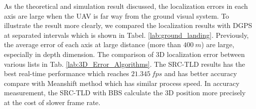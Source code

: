 \begin{table}[!th]
	\centering
	\caption{Eight Experiment Results in Different Weather Condition}
	\label{lab:eight_ground_landing}
\end{table}

As the theoretical and simulation result discussed, the localization errors in each axis are large when the UAV is far way from the ground visual system. To illustrate the result more clearly, we compared the localization results with DGPS at separated intervals which is shown in Tabel. \ref{lab:ground_landing}. Previously, the average error of each axis at large distance (more than $400\ m$) are large, especially in depth dimension. The comparison of 3D localization error between various lists in Tab. \ref{lab:3D_Error_Algorithms}. The SRC-TLD results has the best real-time performance which reaches $21.345\ fps$ and has better accuracy compare with Meanshift method which has similar process speed. In accuracy measurement, the SRC-TLD with BBS calculate the 3D position more precisely at the cost of slower frame rate.

